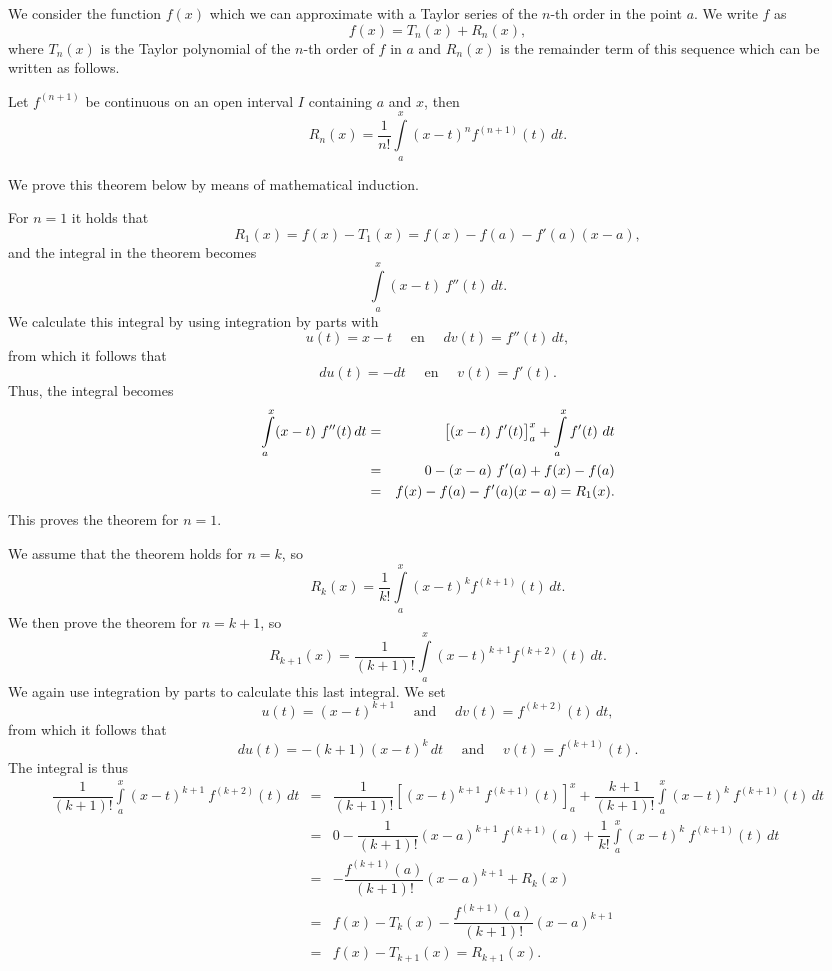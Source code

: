 \begin{Answer}
    We consider the function $f(x)$ which we can approximate with a Taylor series of the $n$-th order in the point $a$. We write $f$ as
    \[f(x) = T_n(x) + R_n(x),  \]
    where $T_n(x)$ is the Taylor polynomial of the $n$-th order of $f$ in $a$ and $R_n(x)$ is the remainder term of this sequence which can be written as follows.\\
    \begin{theorem}
    Let $f^{(n+1)}$ be continuous on an open interval $I$ containing $a$ and $x$, then
    \[R_n(x) = \dfrac{1}{n!} \int\limits_{a}^{x} (x-t)^n f^{(n+1)} (t) \, dt. \]
    \end{theorem}
    
    We prove this theorem below by means of mathematical induction. 
    
    
    For $n=1$ it holds that
    \[R_1(x) = f(x) - T_1(x) = f(x)-f(a)-f'(a)(x-a),\]
    and the integral in the theorem becomes
    \[\int\limits_{a}^{x} (x-t)\  f'' (t) \, dt.
    \]
    We calculate this integral by using integration by parts with
    \[ u(t) = x-t \quad \text{ en } \quad dv(t) = f''(t)\, dt,\]
    from which it follows that
    \[ du(t) = -dt \quad \text{ en } \quad v(t) = f'(t).\]
    Thus, the integral becomes
    \begin{eqnarray*}
    \int\limits_{a}^{x} (x-t) \ f''(t) \, dt
    &=& \left[ (x-t) \ f'(t) \right]_a^x + \displaystyle \int \limits_a^x f'(t) \ dt \\
    &=& 0-(x-a)\ f'(a) + f(x) - f(a) \\
    &=&f(x)-f(a)-f'(a)(x-a) = R_1(x).	
    \end{eqnarray*}
    This proves the theorem for $n=1$. \npar
    
    We assume that the theorem holds for $n=k$, so
    \[R_k(x) = \dfrac{1}{k!} \int\limits_{a}^{x} (x-t)^k f^{(k+1)} (t) \, dt. 
    \]
    We then prove the theorem for $n=k+1$, so
    \[R_{k+1}(x) = \dfrac{1}{(k+1)!} \int\limits_{a}^{x} (x-t)^{k+1} f^{(k+2)} (t) \, dt. 
    \]
    We again use integration by parts to calculate this last integral. We set
    \[ u(t) = (x-t)^{k+1} \quad \text{ and } \quad dv(t) = f^{(k+2)}(t) \, dt,\]
    from which it follows that
    \[ du(t) = -(k+1)(x-t)^k \,dt \quad \text{ and } \quad v(t) = f^{(k+1)}(t).\]
    The integral is thus
    \begin{eqnarray*}
    \dfrac{1}{(k+1)!} \int\limits_{a}^{x} (x-t)^{k+1}\ f^{(k+2)}(t) \, dt 
        &=& \dfrac{1}{(k+1)!} \left[(x-t)^{k+1}\ f^{(k+1)}(t)\right]_a^x + \dfrac{k+1}{(k+1)!}\int\limits_{a}^{x} (x-t)^{k}\ f^{(k+1)}(t) \, dt \\
    	&=& 0 - \dfrac{1}{(k+1)!} (x-a)^{k+1}\ f^{(k+1)}(a)  + \dfrac{1}{k!}\int\limits_{a}^{x} (x-t)^{k}\ f^{(k+1)}(t) \, dt \\
    	&=& - \dfrac{f^{(k+1)}(a)}{(k+1)!}(x-a)^{k+1} + R_k(x) \\ 
    	&=& f(x) - T_k(x) - \dfrac{f^{(k+1)}(a)}{(k+1)!}(x-a)^{k+1} \\ 
    	&=& f(x) - T_{k+1}(x) = R_{k+1}(x). 	
    \end{eqnarray*}
    

\end{Answer}
